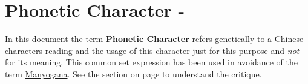 \section{Phonetic Character - } \label{sec:PhoneticCharacter}

In this document the term \textbf{Phonetic Character} refers genetically to a
Chinese characters reading and the usage of this character just for this
purpose and \textit{not} for its meaning. This common set expression has been
used in avoidance of the term \hyperref[sec:Manyogana]{Manyogana}. See the
section  on page \pageref{sec:Manyogana} to understand
the critique.

